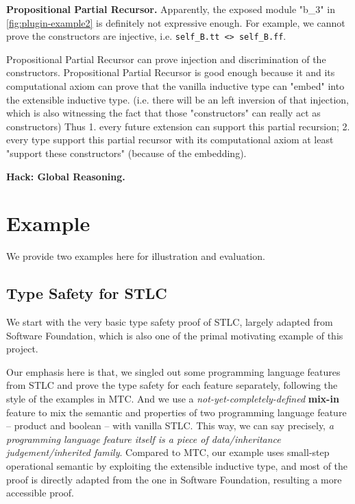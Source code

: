 \textbf{Propositional Partial Recursor.}
Apparently, the exposed module "b_3" in \cref*{fig:plugin-example2} is definitely not expressive enough. For example, we cannot prove the constructors are injective, i.e. \texttt{self_B.tt <> self_B.ff}. 

Propositional Partial Recursor can prove injection and discrimination of the constructors.
Propositional Partial Recursor is good enough because it and its computational axiom can prove that the vanilla inductive type can "embed" into the extensible inductive type. 
(i.e. there will be an left inversion of that injection, which is also witnessing the fact that those "constructors" can really act as constructors) 
Thus 1. every future extension can support this partial recursion; 2. every type support this partial recursor with its computational axiom at least "support these constructors" (because of the embedding).


\textbf{Hack: Global Reasoning.}


\section{Example}
We provide two examples here for illustration and evaluation. 

\subsection{Type Safety for STLC}
We start with the very basic type safety proof of STLC, largely adapted from Software Foundation, which is also one of the primal motivating example of this project. 

Our emphasis here is that, we singled out some programming language features from STLC and prove the type safety for each feature separately, following the style of the examples in MTC\citep{delaware2013,forsta2020}. And we use a \textit{not-yet-completely-defined} \textbf{mix-in} feature to mix the semantic and properties of two programming language feature -- product and boolean -- with vanilla STLC. This way, we can say precisely, \textit{a programming language feature itself is a piece of data/inheritance judgement/inherited family}. Compared to MTC, our example uses small-step operational semantic by exploiting the extensible inductive type, and most of the proof is directly adapted from the one in Software Foundation, resulting a more accessible proof. 

